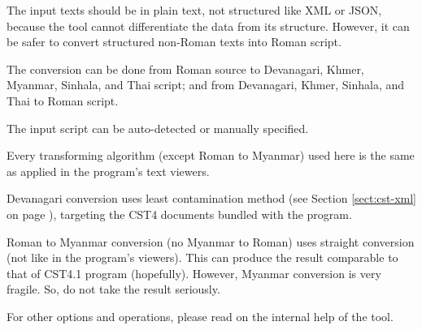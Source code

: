 \begin{compactitem}
\item The input texts should be in plain text, not structured like XML or JSON, because the tool cannot differentiate the data from its structure. However, it can be safer to convert structured non-Roman texts into Roman script.
\item The conversion can be done from Roman source to Devanagari, Khmer, Myanmar, Sinhala, and Thai script; and from Devanagari, Khmer, Sinhala, and Thai to Roman script.
\item The input script can be auto-detected or manually specified.
\item Every transforming algorithm (except Roman to Myanmar) used here is the same as applied in the program's text viewers.
\item Devanagari conversion uses least contamination method (see Section \ref{sect:cst-xml} on page \pageref{sect:cst-xml}), targeting the CST4 documents bundled with the program.
\item Roman to Myanmar conversion (no Myanmar to Roman) uses straight conversion (not like in the program's viewers). This can produce the result comparable to that of CST4.1 program (hopefully). However, Myanmar conversion is very fragile. So, do not take the result seriously.
\item For other options and operations, please read on the internal help of the tool.
\end{compactitem}


